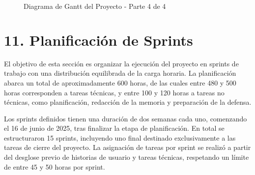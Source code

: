 \documentclass[
11pt, %
]{charter}
\begin{document}
\vspace{15px}

\begin{figure}[htpb]
\centering
{}
\caption{Diagrama de Gantt del Proyecto - Parte 4 de 4}
\label{fig:diagBloques}
\end{figure}

\vspace{25px}

\section{11. Planificación de Sprints}

El objetivo de esta sección es organizar la ejecución del proyecto en sprints de trabajo con una distribución equilibrada de la carga horaria. La planificación abarca un total de aproximadamente 600 horas, de las cuales entre 480 y 500 horas corresponden a tareas técnicas, y entre 100 y 120 horas a tareas no técnicas, como planificación, redacción de la memoria y preparación de la defensa.

Los sprints definidos tienen una duración de dos semanas cada uno, comenzando el 16 de junio de 2025, tras finalizar la etapa de planificación. En total se estructuraron 15 sprints, incluyendo uno final destinado exclusivamente a las tareas de cierre del proyecto. La asignación de tareas por sprint se realizó a partir del desglose previo de historias de usuario y tareas técnicas, respetando un límite de entre 45 y 50 horas por sprint.
\end{document}

